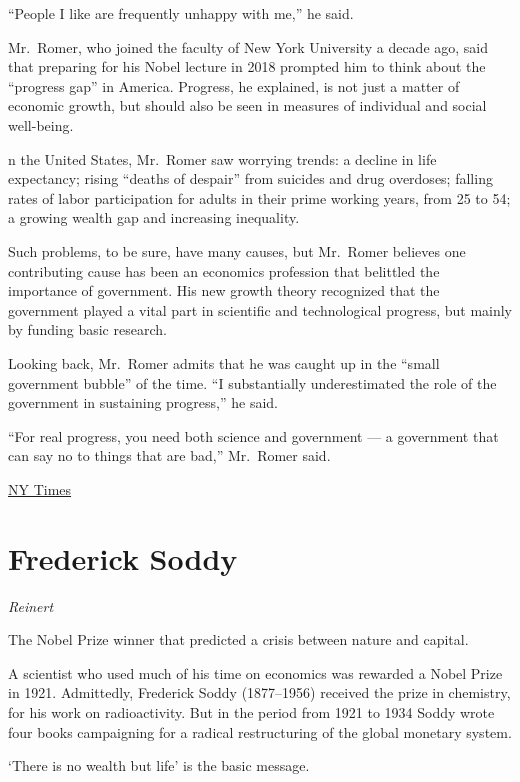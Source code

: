 \documentclass[
]{book}
\begin{document}
``People I like are frequently unhappy with me,'' he said.

Mr.~Romer, who joined the faculty of New York University a decade ago, said that preparing for his Nobel lecture in 2018 prompted him to think about the ``progress gap'' in America. Progress, he explained, is not just a matter of economic growth, but should also be seen in measures of individual and social well-being.

n the United States, Mr.~Romer saw worrying trends: a decline in life expectancy; rising ``deaths of despair'' from suicides and drug overdoses; falling rates of labor participation for adults in their prime working years, from 25 to 54; a growing wealth gap and increasing inequality.

Such problems, to be sure, have many causes, but Mr.~Romer believes one contributing cause has been an economics profession that belittled the importance of government. His new growth theory recognized that the government played a vital part in scientific and technological progress, but mainly by funding basic research.

Looking back, Mr.~Romer admits that he was caught up in the ``small government bubble'' of the time. ``I substantially underestimated the role of the government in sustaining progress,'' he said.

``For real progress, you need both science and government --- a government that can say no to things that are bad,'' Mr.~Romer said.

\href{https://www.nytimes.com/2021/05/20/technology/tech-antitrust-paul-romer.html}{NY Times}

\hypertarget{frederick-soddy}{%
\section{Frederick Soddy}\label{frederick-soddy}}

\emph{Reinert}

The Nobel Prize winner that predicted a crisis between nature and capital.

A scientist who used much of his time on economics was rewarded a Nobel Prize in 1921. Admittedly, Frederick Soddy (1877--1956) received the prize in chemistry, for his work on radioactivity. But in the period from 1921 to 1934 Soddy wrote four books campaigning for a radical restructuring of the global monetary system.

`There is no wealth but life' is the basic message.
\end{document}
